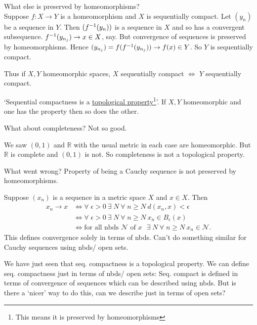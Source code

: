 What else is preserved by homeomorphisms? \\
Suppose $f: X \to Y$ is a homeomorphism and $X$ is sequentially compact.
Let $(y_n)$ be a sequence in $Y$.
Then $(f^{-1}(y_n))$ is a sequence in $X$ and so has a convergent subsequence.
$f^{-1}(y_{n_j}) \to x \in X$, say.
But convergence of sequences is preserved by homeomorphisms.
Hence $(y_{n_j}) = f(f^{-1}(y_{n_j})) \to f(x) \in Y$.
So $Y$ is sequentially compact.

Thus if $X, Y$ homeomorphic spaces, $X$ sequentially compact $\iff$ $Y$ sequentially compact.

`Sequential compactness is a \underline{topological property}\footnote{This means it is preserved by homeomorphisms}'.
If $X, Y$ homeomorphic and one has the property then so does the other.

What about completeness?
Not so good.

\begin{example}
    We saw $(0, 1)$ and $\mathbb{R}$ with the usual metric in each case are homeomorphic.
    But $\mathbb{R}$ is complete and $(0, 1)$ is not.
    So completeness is not a topological property.
\end{example} 

What went wrong?
Property of being a Cauchy sequence is not preserved by homeomorphisms.

\begin{remark}
    Suppose $(x_n)$ is a sequence in a metric space $X$ and $x \in X$.
    Then
    \begin{align*}
        x_n \to x &\iff \forall \; \epsilon > 0 \ \exists \; N \ \forall \; n \geq N \ d(x_n, x) < \epsilon \\
        &\iff \forall \; \epsilon > 0 \ \exists \; N \ \forall \; n \geq N \ x_n \in B_\epsilon(x) \\
        &\iff \text{for all nbds $\mathcal{N}$ of $x$ $\exists \; N \ \forall \; n \geq N \ x_n \in \mathcal{N}$.}
    \end{align*} 
    This defines convergence solely in terms of nbds.
    Can't do something similar for Cauchy sequences using nbds/ open sets.
\end{remark} 

We have just seen that seq. compactness is a topological property.
We can define seq. compactness just in terms of nbds/ open sets:
Seq. compact is defined in terms of convergence of sequences which can be described using nbds.
But is there a `nicer' way to do this, can we describe just in terms of open sets?

